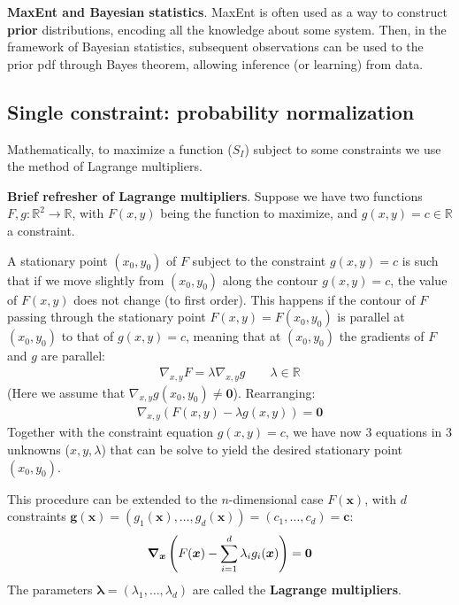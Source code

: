 \documentclass[../template.tex]{subfiles}
\begin{document}
\begin{appr}\textbf{MaxEnt and Bayesian statistics}. MaxEnt is often used as a way to construct \textbf{prior} distributions, encoding all the  knowledge about some system. Then, in the framework of Bayesian statistics, subsequent observations can be used to  the prior pdf through Bayes theorem, allowing inference (or learning) from data.  
\end{appr}

\subsection{Single constraint: probability normalization}
Mathematically, to maximize a function ($S_I$) subject to some constraints we use the method of Lagrange multipliers.

\begin{expl}\textbf{Brief refresher of Lagrange multipliers}. Suppose we have two functions $F, g\colon \mathbb{R}^2 \to \mathbb{R}$, with $F(x,y)$ being the function to maximize, and $g(x,y) = c \in \mathbb{R}$ a constraint. 
    
A stationary point $(x_0,y_0)$ of $F$ subject to the constraint $g(x,y) = c$ is such that if we move slightly from $(x_0,y_0)$ along the contour $g(x,y) = c$, the value of $F(x,y)$ does not change (to first order). This happens if the contour of $F$ passing through the stationary point $F(x,y) = F(x_0, y_0)$ is parallel at $(x_0,y_0)$ to that of $g(x,y) = c$, meaning that at $(x_0, y_0)$ the gradients of $F$ and $g$ are parallel:
    \begin{align*}
        \nabla_{x,y} F = \lambda \nabla_{{x,y}} g \qquad \lambda \in \mathbb{R}
    \end{align*}
    (Here we assume that $\nabla_{x,y} g (x_0,y_0) \neq \bm{0}$). Rearranging:
    \begin{align*}
        \nabla_{x,y} (F(x,y) - \lambda g(x,y)) = \bm{0}
    \end{align*}
    Together with the constraint equation $g(x,y) = c$, we have now $3$ equations in $3$ unknowns ($x,y,\lambda$) that can be solve to yield the desired stationary point $(x_0, y_0)$.

    \medskip

    This procedure can be extended to the $n$-dimensional case $F(\bm{x})$, with $d$ constraints $\bm{g}(\bm{x}) = (g_1(\bm{x}), \dots, g_d(\bm{x})) = (c_1,\dots,c_d) = \bm{c}$:
    \begin{align*}
        \grad_{\bm{x}} \left(F(\bm{x}) - \sum_{i=1}^d \lambda_i g_i(\bm{x})\right) = \bm{0}
    \end{align*}
    The parameters $\bm{\lambda} = (\lambda_1, \dots, \lambda_d)$ are called the \textbf{Lagrange multipliers}.  
\end{expl}
\end{document}
